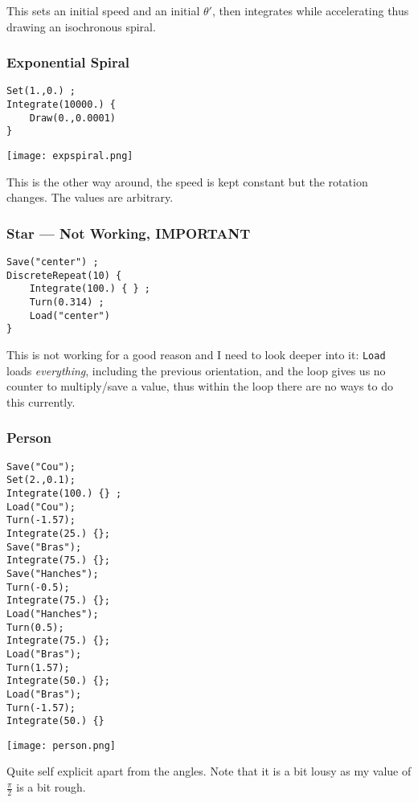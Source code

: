 \documentclass[hidelinks,10pt]{article}
\begin{document}
This sets an initial speed and an initial $\theta'$, then integrates while
accelerating thus drawing an isochronous spiral.

\subsubsection{Exponential Spiral}
\begin{verbatim}
Set(1.,0.) ;
Integrate(10000.) {
    Draw(0.,0.0001)
}
\end{verbatim}
\texttt{[image: expspiral.png]}

This is the other way around, the speed is kept constant but the rotation
changes. The values are arbitrary.

\subsubsection{Star --- Not Working, IMPORTANT}
\begin{verbatim}
Save("center") ;
DiscreteRepeat(10) {
    Integrate(100.) { } ;
    Turn(0.314) ;
    Load("center")
}
\end{verbatim}

This is not working for a good reason and I need to look deeper into it:
\texttt{Load} loads \emph{everything}, including the previous orientation, and
the loop gives us no counter to multiply/save a value, thus within the loop
there are no ways to do this currently.

\subsubsection{Person}
\begin{verbatim}
Save("Cou");
Set(2.,0.1);
Integrate(100.) {} ;
Load("Cou");
Turn(-1.57);
Integrate(25.) {};
Save("Bras");
Integrate(75.) {};
Save("Hanches");
Turn(-0.5);
Integrate(75.) {};
Load("Hanches");
Turn(0.5);
Integrate(75.) {};
Load("Bras");
Turn(1.57);
Integrate(50.) {};
Load("Bras");
Turn(-1.57);
Integrate(50.) {}
\end{verbatim}
\texttt{[image: person.png]}

Quite self explicit apart from the angles. Note that it is a bit lousy as my
value of $\frac{\pi}{2}$ is a bit rough.
\end{document}
